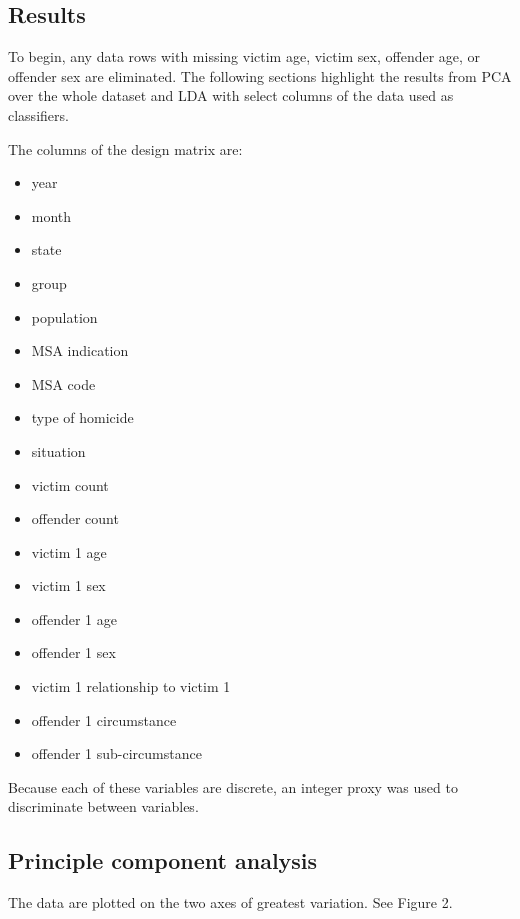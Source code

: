 \begin{multicols}{2}
\section{Results}

To begin, any data rows with missing victim age, victim sex, offender age, or offender sex are eliminated.  The following sections highlight the results from PCA over the whole dataset and LDA with select columns of the data used as classifiers.  

The columns of the design matrix are:

\begin{itemize}
  \item year
  \item month
  \item state
  \item group
  \item population
  \item MSA indication
  \item MSA code
  \item type of homicide
  \item situation
  \item victim count
  \item offender count
  \item victim 1 age
  \item victim 1 sex
  \item offender 1 age
  \item offender 1 sex
  \item victim 1 relationship to victim 1
  \item offender 1 circumstance
  \item offender 1 sub-circumstance
\end{itemize}

Because each of these variables are discrete, an integer proxy was used to discriminate between variables.

\subsection{Principle component analysis}

The data are plotted on the two axes of greatest variation.  See Figure 2.


\end{multicols}
